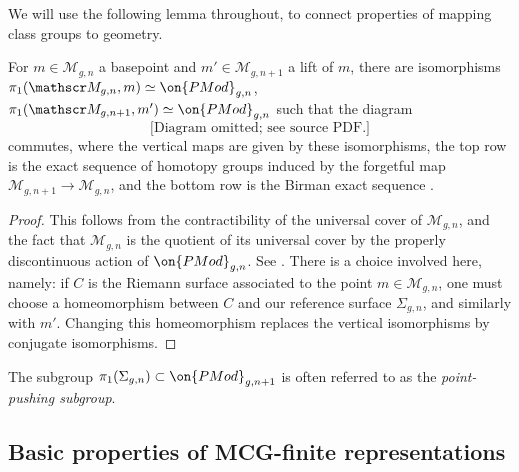We will use the following lemma throughout, to connect properties of mapping class groups to geometry.
\begin{lemma}
\notready
	\label{lemma:mgn-fundamental-group}
	For $m \in \mathscr M_{g,n}$ a basepoint and $m'\in \mathscr M_{g, n+1}$ a lift of $m$, there are isomorphisms $\pi_1(\mathscr M_{g,n}, m) \simeq \on{PMod}_{g,n}$, $\pi_1(\mathscr M_{g,n+1}, m') \simeq \on{PMod}_{g,n}$ such that the diagram
	$$\text{[Diagram omitted; see source PDF.]}$$
	commutes, where the vertical maps are given by these isomorphisms, the top row is the exact sequence of homotopy groups induced by the forgetful map $\mathscr{M}_{g,n+1}\to \mathscr{M}_{g,n}$,  and the bottom row is the Birman exact sequence \cite[p.~98]{farbM:a-primer}.
\end{lemma}
\begin{proof}
This follows from the contractibility of the universal cover of $\mathscr{M}_{g,
n}$, and the fact that $\mathscr{M}_{g,n}$ is the quotient of its universal
cover by the properly discontinuous action of $\on{PMod}_{g,n}$. See
\cite[\S10.6.3 and p. 353]{farbM:a-primer}. There is a choice involved here, namely: if $C$ is the Riemann surface associated to the point $m\in \mathscr{M}_{g,n}$, one must choose a homeomorphism between $C$ and our reference surface $\Sigma_{g,n}$, and similarly with $m'$. Changing this homeomorphism replaces the vertical isomorphisms by conjugate isomorphisms.
\end{proof}
The subgroup $ \pi_1(\Sigma_{g,n})\subset \on{PMod}_{g,n+1} $ is often referred to as the \emph{point-pushing subgroup}.

\subsection{Basic properties of MCG-finite representations}\label{subsection:basic-properties}

